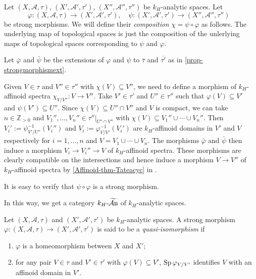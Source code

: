 \begin{definition}\label{def-strongmorphismcompo}
    Let $(X,\mathcal{A},\tau)$, $(X',\mathcal{A}',\tau')$, $(X'',\mathcal{A}'',\tau'')$ be $k_H$-analytic spaces. Let 
    \[
        \varphi:  (X,\mathcal{A},\tau)\rightarrow (X',\mathcal{A}',\tau'),\quad \psi: (X',\mathcal{A}',\tau')\rightarrow (X'',\mathcal{A}'',\tau'')
    \]
    be strong morphisms. We will define their \emph{composition} $\chi=\psi\circ \varphi$ as follows. The underlying map of topological spaces is just the composition of the unlerlying maps of topological spaces corresponding to $\psi$ and $\varphi$.
    
    Let $\bar{\varphi}$ and $\bar{\psi}$ be the extensions of  $\varphi$ and $\psi$ to $\bar{\tau}$ and $\overline{\tau'}$ as in \cref{prop-strongmorphismext}. 
    
    Given $V\in \tau$ and $V''\in \tau''$ with $\chi(V)\subseteq V''$, we need to define a morphism of $k_H$-affinoid spectra $\chi_{V/V''}:V\rightarrow V''$. Take $V'\in \tau'$ and $U''\in \tau''$ such that $\varphi(V)\subseteq V'$ and $\psi(V')\subseteq U''$. Since $\chi(V)\subseteq U''\cap V''$ and $V$ is compact, we can take $n\in \mathbb{Z}_{>0}$ and $V_1'',\ldots,V_n''\in \tau''|_{U''\cap V''}$ with $\chi(V)\subseteq V_1''\cup\cdots\cup V_n''$. Then $V_i':=\psi^{-1}_{V'/U''}(V_i'')$ and $V_i:=\varphi_{V/V'}^{-1}(V_i')$ are $k_H$-affinoid domains in $V'$ and $V$ respectively for $i=1,\ldots,n$ and $V=V_1\cup\cdots\cup V_n$. The morphisms $\bar{\varphi}$ and $\bar{\psi}$ then induce a morphism $V_i\rightarrow V_i''\rightarrow V$ of $k_H$-affinoid spectra. These morphisms are clearly compatible on the intersections and hence induce a morphism $V\rightarrow V''$ of $k_H$-affinoid spectra by \cref{Affinoid-thm-Tateacyc} in .

    It is easy to verify that $\psi\circ \varphi$ is a strong morphism.

    In this way, we get a category $k_H\text{-}\widetilde{\mathcal{A}\mathrm{n}}$ of $k_H$-analytic spaces. 
\end{definition}

\begin{definition}
    Let $(X,\mathcal{A},\tau)$ and $(X',\mathcal{A}',\tau')$ be $k_H$-analytic spaces. A strong morphism $\varphi:(X,\mathcal{A},\tau)\rightarrow (X',\mathcal{A}',\tau')$ is said to be a \emph{quasi-isomorphism} if 
    \begin{enumerate}
        \item $\varphi$ is a homeomorphism between $X$ and $X'$;
        \item for any pair $V\in \tau$ and $V'\in \tau'$ with $\varphi(V)\subseteq V'$, $\operatorname{Sp} \varphi_{V/V'}$ identifies $V$ with an affinoid domain in $V'$.
    \end{enumerate}
\end{definition}

